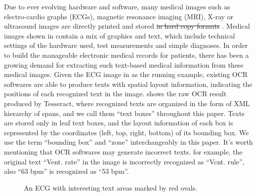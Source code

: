 Due to ever evolving hardware and software, many medical images
such as electro-cardio graphs (ECGs), magnetic resonance imaging (MRI),
X-ray or ultrasound images are directly printed and stored
\st{in hard copy formats} .
Medical images shown in 
contain a mix of graphics and text,
which include technical settings of the hardware used,
test measurements and simple diagnoses.
In order to build the manageable electronic medical records for patients,
there has been a growing demand for extracting such text-based
medical information from these medical images.
Given the ECG image in  as the running example,
existing OCR softwares are able to produce texts with spatial layout information,
indicating the positions of each recognized text in the image.
 shows the raw OCR result produced by Tesseract,
where recognized texts are organized in the form of XML hierarchy of spans,
and we call them ``text boxes'' throughout this paper.
Texts are stored only in leaf text boxes,
and the layout information of each box is represented by
the coordinates (left, top, right, bottom) of its bounding box.
We use the term ``bounding box'' and ``zone'' interchangeably in this paper.
It's worth mentioning that OCR softwares may generate incorrect texts.
for example, the original text ``Vent. rate'' in the image
is incorrectly recognized as ``Vcnt. rule'',
also ``63 bpm'' is recognized as ``53 bpm''.

\begin{figure*}[ht]
\centering
{}
\caption{An ECG with interesting text areas marked by red ovals.}
\label{fig:running-ecg}
\end{figure*}





